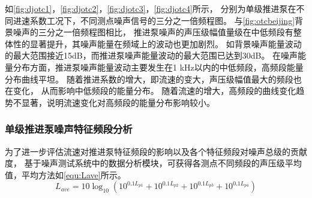 如\autoref{fig:djotc1}，\autoref{fig:djotc2}，\autoref{fig:djotc3}，\autoref{fig:djotc4}所示，
分别为单级推进泵在不同进速系数工况下，不同测点噪声信号的三分之一倍频程图。
与\autoref{fig:otcbeijing}背景噪声的三分之一倍频程图相比，
推进泵噪声的声压级幅值量级在中低频段有整体性的显著提升，其噪声能量在频域上的波动也更加剧烈。
如背景噪声能量波动的最大范围接近15dB，而推进泵噪声能量波动的最大范围已达到30dB。
在噪声能量分布方面，推进泵噪声能量波动主要发生在1 kHz以内的中低频段，高频段能量分布曲线平坦。
随着推进系数的增大，即流速的变大，声压级幅值最大的频段也在变化，
从而影响中低频段的能量分布。
随着流速的增大，高频段的曲线变化趋势不显著，说明流速变化对高频段的能量分布影响较小。
\begin{comment}
\begin{figure}[htbp]
        \centering
        \subfigure[pic1.]{
        \texttt{[image: 3dj2\_otc.png]}
        }
\end{figure}
\addtocounter{figure}{-1}
\begin{figure}[htbp]
        \centering
        \addtocounter{figure}{1} 
        \subfigure[pic2.]{
        \texttt{[image: 3dj7\_otc.png]}
        }
\end{figure}
\addtocounter{figure}{-1}
\begin{figure}[htbp]
        \centering
        \addtocounter{figure}{1} 
        \vspace{0.02cm}
        \subfigure[pic2.]{
        \texttt{[image: 3dj6\_otc.png]}
        }
\end{figure}
\addtocounter{figure}{-1}
\begin{figure}[htbp]
        \centering
        \addtocounter{figure}{1} 
        \vspace{0.02cm}
        \subfigure[pic2.]{
        \texttt{[image: 3dj3\_otc.png]}
        }
        \caption{\label{fig:dj_modle}不同进速系数下单级推进泵水下噪声三分之一倍频程图}
\end{figure}
\end{comment}
\subsubsection{单级推进泵噪声特征频段分析}
为了进一步评估流速对推进泵特征频段的影响以及各个特征频段对噪声总级的贡献度，
基于噪声测试系统中的数据分析模块，可获得各测点不同频段的声压级平均值，平均方法如\autoref{equ:Lave}所示。
\begin{equation}
    \label{equ:Lave}
    L_{ave}=10\log_{10}\left ( {10^{0.1L_{p1}}}+{10^{0.1L_{p2}}}+{10^{0.1L_{p3}}}+{10^{0.1L_{p4}}}  \right ) 
\end{equation}

